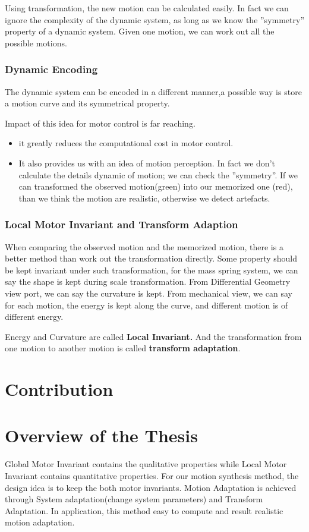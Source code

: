 Using transformation, the new motion can be calculated easily.
In fact we can ignore the complexity of the dynamic system, as long as we know the ''symmetry'' property of a dynamic system. 
Given one motion, we can work out all the possible motions.

\subsubsection*{Dynamic Encoding}

The dynamic system can be encoded in a different manner,a possible way is store a motion curve and its symmetrical property.

Impact of this idea for motor control is far reaching. 
\begin{itemize}
\item it greatly reduces the computational cost in motor control.
\item It also provides us with an idea of motion perception. 
In fact we don’t calculate the details dynamic of motion; we can check the ''symmetry''.
If we can transformed the observed motion(green) into our memorized one (red), than we think the motion are realistic, otherwise we detect artefacts.
\end{itemize}

\subsubsection*{Local Motor Invariant and Transform Adaption}
When comparing the observed motion and the memorized motion, there is a better method than work out the transformation directly. 
Some property should be kept invariant under such transformation, for the mass spring system, we can say the shape is kept during scale transformation. 
From Differential Geometry view port, we can say the curvature is kept. 
From mechanical view, we can say for each motion, the energy is kept along the curve, and different motion is of different energy. 

Energy and Curvature are called \textbf{Local Invariant.} 
And the transformation from one motion to another motion is called \textbf{transform adaptation}.

\section{Contribution}




\section{Overview of the Thesis}
Global Motor Invariant contains the qualitative properties while Local Motor Invariant contains quantitative properties. 
For our motion synthesis method, the design idea is to keep the both motor invariants. 
Motion Adaptation is achieved through System adaptation(change system parameters) and Transform Adaptation.
In application, this method easy to compute and result realistic motion adaptation.



